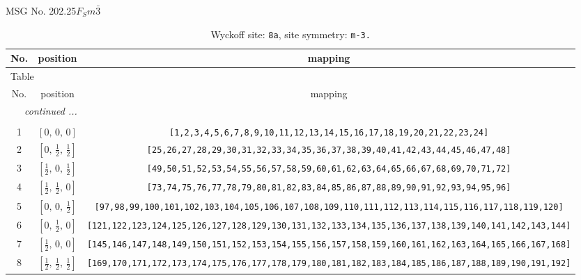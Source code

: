 \documentclass[fleqn,8pt]{jsarticle}
\begin{document}
\setcounter{MaxMatrixCols}{32}

\renewcommand{\tablename}{Table~}
\renewcommand{\figurename}{Figure~}
\begin{center}
\LARGE
MSG No. 202.25\quad$F_{S}m\bar{3}$
\end{center}
\renewcommand{\arraystretch}{1.2}
\begin{longtable}{ccc}
\caption{Wyckoff site: {\tt 8a}, site symmetry: {\tt m-3.}}
 \\
 \hline \hline
No. & position & mapping \\ \hline \endfirsthead

\multicolumn{2}{l}{\tablename\ \thetable{}} \\
 \hline \hline
No. & position & mapping \\ \hline \endhead

 \hline \hline
\multicolumn{2}{r}{\footnotesize\it continued ...} \\ \endfoot

 \hline \hline
\multicolumn{2}{r}{} \\ \endlastfoot

1 & $\left[ 0,\, 0,\, 0 \right]$ & {\tt [1,2,3,4,5,6,7,8,9,10,11,12,13,14,15,16,17,18,19,20,21,22,23,24]} \\ \hline
2 & $\left[ 0,\, \frac{1}{2},\, \frac{1}{2} \right]$ & {\tt [25,26,27,28,29,30,31,32,33,34,35,36,37,38,39,40,41,42,43,44,45,46,47,48]} \\ \hline
3 & $\left[ \frac{1}{2},\, 0,\, \frac{1}{2} \right]$ & {\tt [49,50,51,52,53,54,55,56,57,58,59,60,61,62,63,64,65,66,67,68,69,70,71,72]} \\ \hline
4 & $\left[ \frac{1}{2},\, \frac{1}{2},\, 0 \right]$ & {\tt [73,74,75,76,77,78,79,80,81,82,83,84,85,86,87,88,89,90,91,92,93,94,95,96]} \\ \hline
5 & $\left[ 0,\, 0,\, \frac{1}{2} \right]$ & {\tt [97,98,99,100,101,102,103,104,105,106,107,108,109,110,111,112,113,114,115,116,117,118,119,120]} \\ \hline
6 & $\left[ 0,\, \frac{1}{2},\, 0 \right]$ & {\tt [121,122,123,124,125,126,127,128,129,130,131,132,133,134,135,136,137,138,139,140,141,142,143,144]} \\ \hline
7 & $\left[ \frac{1}{2},\, 0,\, 0 \right]$ & {\tt [145,146,147,148,149,150,151,152,153,154,155,156,157,158,159,160,161,162,163,164,165,166,167,168]} \\ \hline
8 & $\left[ \frac{1}{2},\, \frac{1}{2},\, \frac{1}{2} \right]$ & {\tt [169,170,171,172,173,174,175,176,177,178,179,180,181,182,183,184,185,186,187,188,189,190,191,192]} \\
\end{longtable}
\end{document}
